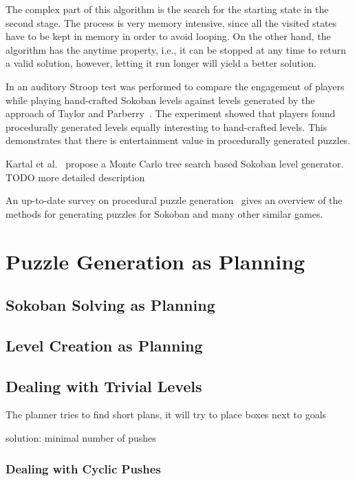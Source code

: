 \documentclass[runningheads]{llncs}
\begin{document}
The complex part of this algorithm is the search for the starting state in the second stage. 
The process is very memory intensive, since all the visited states have to be kept in 
memory in order to avoid looping. On the other hand, the algorithm has the anytime property, i.e., it 
can be stopped at any time to return a valid solution, however, letting it run longer will yield
a better solution.

In \cite{taylor2015attention} an auditory Stroop test was performed to compare the engagement of
players while playing hand-crafted Sokoban levels against levels generated by the approach of 
Taylor and Parberry~\cite{taylor2011procedural}. The experiment showed that players found
procedurally generated levels equally interesting to hand-crafted levels. This demonstrates
that there is entertainment value in procedurally generated puzzles.

Kartal et al.~\cite{kartal2016data} propose a Monte Carlo tree search based Sokoban level
generator.
TODO more detailed description

An up-to-date survey on procedural puzzle generation~\cite{de2019procedural} gives an overview
of the methods for generating puzzles for Sokoban and many other similar games.

\section{Puzzle Generation as Planning}

\subsection{Sokoban Solving as Planning}

\subsection{Level Creation as Planning}

\subsection{Dealing with Trivial Levels}
The planner tries to find short plans, it will try to place boxes next to goals

solution: minimal number of pushes

\subsubsection{Dealing with Cyclic Pushes}
\end{document}
